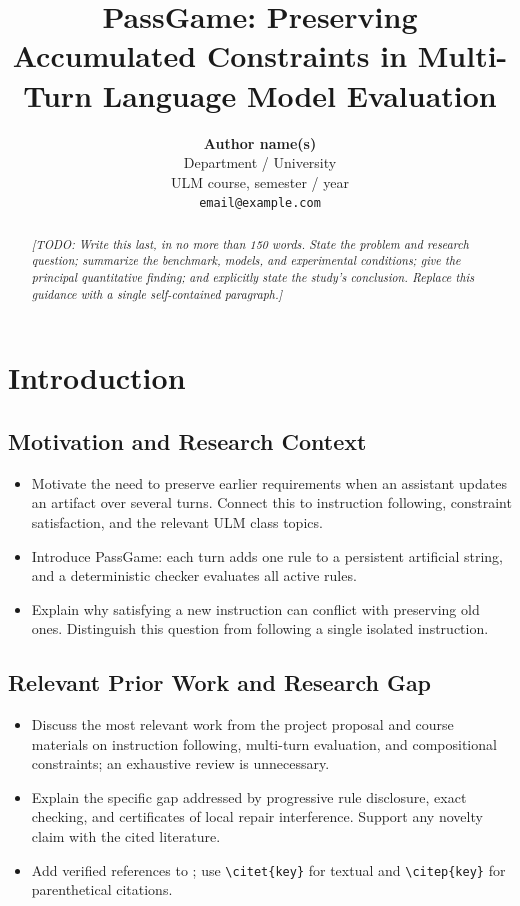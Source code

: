 \documentclass[11pt]{article}
\title{PassGame: Preserving Accumulated Constraints in Multi-Turn Language Model Evaluation}
\author{\textbf{Author name(s)} \\
  Department / University \\
  ULM course, semester / year \\
  \texttt{email@example.com}}
\newcommand{\todo}[1]{\textit{[TODO: #1]}}
\begin{document}
\maketitle

\begin{abstract}
\todo{Write this last, in no more than 150 words. State the problem and research
question; summarize the benchmark, models, and experimental conditions; give
the principal quantitative finding; and explicitly state the study's conclusion.
Replace this guidance with a single self-contained paragraph.}
\end{abstract}

\section{Introduction}
\label{sec:introduction}

\subsection{Motivation and Research Context}
\begin{itemize}
  \item Motivate the need to preserve earlier requirements when an assistant
  updates an artifact over several turns. Connect this to instruction following,
  constraint satisfaction, and the relevant ULM class topics.
  \item Introduce PassGame: each turn adds one rule to a persistent artificial
  string, and a deterministic checker evaluates all active rules.
  \item Explain why satisfying a new instruction can conflict with preserving
  old ones. Distinguish this question from following a single isolated instruction.
\end{itemize}

\subsection{Relevant Prior Work and Research Gap}
\begin{itemize}
  \item Discuss the most relevant work from the project proposal and course
  materials on instruction following, multi-turn evaluation, and compositional
  constraints; an exhaustive review is unnecessary.
  \item Explain the specific gap addressed by progressive rule disclosure,
  exact checking, and certificates of local repair interference. Support any
  novelty claim with the cited literature.
  \item Add verified references to ; use
  \verb|\citet{key}| for textual and \verb|\citep{key}| for parenthetical citations.
\end{itemize}
\end{document}
